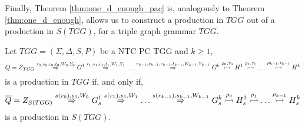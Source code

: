 
Finally, Theorem \ref{thm:one_d_enough_pac} is, analogously to Theorem \ref{thm:one_d_enough}, allows us to construct a production in $TGG$ out of a production in $S(TGG)$, for a triple graph grammar $TGG$.

\begin{theorem}
	\label{thm:one_d_enough_pac}
	Let $TGG = (\Sigma, \Delta, S, P)$ be a NTC PC TGG and $k \ge 1$,
	\begin{equation*}
		Q = \startTG{TGG} \tderivpac{r_0}{s_0,c_0,t_0}{W_0,Y_0}{} G^1 \tderivpac{r_1}{s_1,c_1,t_1}{W_1,Y_1}{} \dots \tderivpac{r_{k-1}}{s_{k-1},c_{k-1},t_{k-1}}{W_{k-1},Y_{k-1}}{} G^k \tresolv{\rho_0,\tau_0} H^1 \tresolv{\rho_1,\tau_1} \dots \tresolv{\rho_{k-1},\tau_{k-1}} H^k
	\end{equation*}
	is a production in $TGG$ if, and only if,
	\begin{equation*}
		\overline{Q} = \startG{S(TGG)} \derivpac{s(r_0)}{s_0}{W_0}{} G^1_s \derivpac{s(r_1)}{s_1}{W_1}{} \dots \derivpac{s(r_{k-1})}{s_{k-1}}{W_{k-1}}{} G^k_s \tresolv{\rho_0} H_s^1 \tresolv{\rho_1} \dots \tresolv{\rho_{k-1}} H_s^k
	\end{equation*}
	is a production in $S(TGG)$.
\end{theorem}
